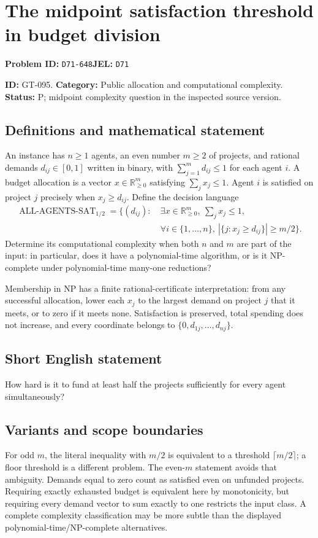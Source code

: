 \documentclass[11pt,a4paper]{article}
\begin{document}
\section*{The midpoint satisfaction threshold in budget division}
\textbf{Problem ID:} \texttt{D71-648}\quad \textbf{JEL:} \texttt{D71}\par
\label{problem:OP-0225}
\label{game:GT-095}
{\sffamily\small\color{muted}
\noindent\textbf{ID:} GT-095. \textbf{Category:} Public allocation and computational complexity.
\textbf{Status:} P; midpoint complexity question in the inspected source version.
\par}
\subsection*{Definitions and mathematical statement}
An instance has $n\geq1$ agents, an even number $m\geq2$ of projects, and rational demands
$d_{ij}\in[0,1]$ written in binary, with $\sum_{j=1}^m d_{ij}\leq1$ for each agent $i$. A budget allocation is a vector $x\in\mathbb R_{\geq0}^{m}$ satisfying $\sum_jx_j\leq1$. Agent $i$ is satisfied on project $j$ precisely when $x_j\geq d_{ij}$. Define the decision language
\[
 \begin{split}
 \operatorname{ALL\text{-}AGENTS\text{-}SAT}_{1/2}
 =\{(d_{ij}):\ &\exists x\in\mathbb R_{\geq0}^m,
 \ \sum_jx_j\leq1,\\[-2pt]
 &\forall i\in\{1,\ldots,n\},\
       |\{j:x_j\geq d_{ij}\}|\geq m/2\}.
 \end{split}
\]
Determine its computational complexity when both $n$ and $m$ are part of the input: in particular, does it have a polynomial-time algorithm, or is it NP-complete under polynomial-time many-one reductions?

Membership in NP has a finite rational-certificate interpretation: from any successful allocation, lower each $x_j$ to the largest demand on project $j$ that it meets, or to zero if it meets none. Satisfaction is preserved, total spending does not increase, and every coordinate belongs to $\{0,d_{1j},\ldots,d_{nj}\}$.

\subsection*{Short English statement}
How hard is it to fund at least half the projects sufficiently for every agent simultaneously?

\subsection*{Variants and scope boundaries}
For odd $m$, the literal inequality with $m/2$ is equivalent to a threshold $\lceil m/2\rceil$; a floor threshold is a different problem. The even-$m$ statement avoids that ambiguity. Demands equal to zero count as satisfied even on unfunded projects. Requiring exactly exhausted budget is equivalent here by monotonicity, but requiring every demand vector to sum exactly to one restricts the input class. A complete complexity classification may be more subtle than the displayed polynomial-time/NP-complete alternatives.
\end{document}
